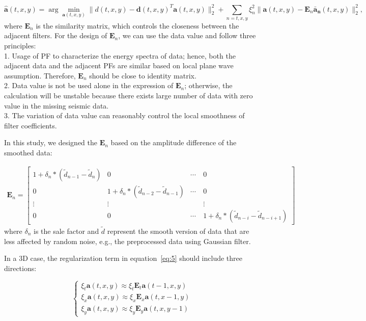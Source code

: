 \begin{equation}
  \label{eq:5}
  \widehat{\mathbf{a}}(t,x,y)=\arg\min_{\mathbf{a}(t,x,y)}\parallel d(t,x,y)-\mathbf{d}(t,x,y)^{T}\mathbf{a}(t,x,y)\parallel_{2}^{2}+\sum_{n=t,x,y}\xi_{n}^2\parallel \mathbf{a}(t,x,y)-\mathbf{E}_n\mathbf{\bar{a}_n}(t,x,y)\parallel_{2}^{2},
\end{equation}
where $\mathbf{E}_n$ is the similarity matrix, which controls the
closeness between the adjacent filters. For the design of
$\mathbf{E}_n$, we can use the data value and follow three principles: \\
1. Usage of PF to characterize the energy spectra of data; hence, both
the adjacent data and the adjacent PFs are similar based on local
plane wave assumption. Therefore, $\mathbf{E}_n$ should be close to
identity matrix.\\ 2. Data value is not be used alone in the
expression of $\mathbf{E}_n$; otherwise, the calculation will be
unstable because there exists large number of data with zero value in
the missing seismic data.\\ 3. The variation of data value can
reasonably control the local smoothness of filter coefficients.

In this study, we designed the $\mathbf{E}_n$ based on
the amplitude difference of the smoothed data:

\begin{equation}
\begin{aligned}
  \label{eq:6}
  \mathbf{E}_n=
  \begin{bmatrix}
  1+\delta_{n} * (\tilde{d}_{n-1}-\tilde{d}_n) & 0 & \cdots & 0 \\
  0 & 1+\delta_{n} * (\tilde{d}_{n-2}-\tilde{d}_{n-1}) & \cdots & 0 \\
  \vdots & \vdots &\quad &\vdots \\
  0 & 0 & \cdots & 1+\delta_{n} * (\tilde{d}_{n-i}-\tilde{d}_{n-i+1})  
  \end{bmatrix}
  \end{aligned}
\end{equation}
where $\delta_n$ is the sale factor and $\tilde{d}$ represent the
smooth version of data that are less affected by random noise, e.g.,
the preprocessed data using Gaussian filter.

In a 3D case, the regularization term in equation~\ref{eq:5} should
include three directions:

\begin{equation}
  \label{eq:xi}
\begin{cases}

\xi_t\mathbf{a}(t,x,y)\approx\xi_t\mathbf{E}_t\mathbf{a}(t-1,x,y)\\
\xi_x\mathbf{a}(t,x,y)\approx\xi_x\mathbf{E}_x\mathbf{a}(t,x-1,y)\\
\xi_y\mathbf{a}(t,x,y)\approx\xi_y\mathbf{E}_y\mathbf{a}(t,x,y-1)

\end{cases}
\end{equation}

